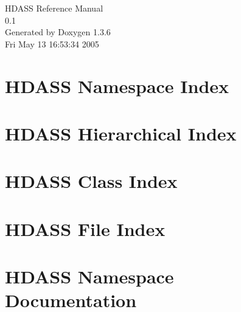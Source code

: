 \documentclass[a4paper]{book}
\begin{document}
\begin{titlepage}
\vspace*{7cm}
\begin{center}
{\Large HDASS Reference Manual\\[1ex]\large 0.1 }\\
\vspace*{1cm}
{\large Generated by Doxygen 1.3.6}\\
\vspace*{0.5cm}
{\small Fri May 13 16:53:34 2005}\\
\end{center}
\end{titlepage}
\clearemptydoublepage
{}
\tableofcontents
\clearemptydoublepage
{}
\chapter{HDASS Namespace Index}

\chapter{HDASS Hierarchical Index}

\chapter{HDASS Class Index}

\chapter{HDASS File Index}

\chapter{HDASS Namespace Documentation}





\end{document}
